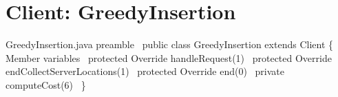 \chapter{Client: GreedyInsertion}%

\endmoddef\nwstartdeflinemarkup\nwenddeflinemarkup
\LA{}GreedyInsertion.java preamble~{\nwtagstyle{}}\RA{}
public class GreedyInsertion extends Client \{
  \LA{}Member variables~{\nwtagstyle{}}\RA{}
  protected \LA{}Override handleRequest(1)~{\nwtagstyle{}}\RA{}
  protected \LA{}Override endCollectServerLocations(1)~{\nwtagstyle{}}\RA{}
  protected \LA{}Override end(0)~{\nwtagstyle{}}\RA{}
  private \LA{}computeCost(6)~{\nwtagstyle{}}\RA{}
\}
\nwendcode{}

